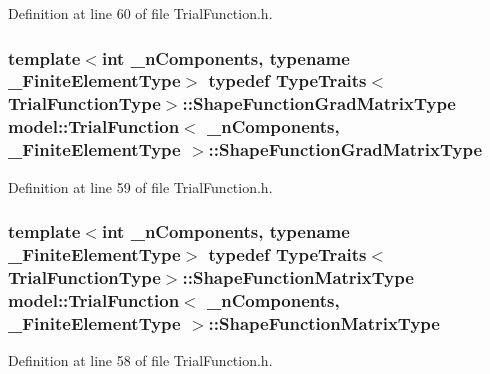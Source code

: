 Definition at line 60 of file Trial\+Function.\+h.

\hypertarget{classmodel_1_1_trial_function_adf8d15a6967d142e4b5807db94294f66}{}
\subsubsection[{Shape\+Function\+Grad\+Matrix\+Type}]{\setlength{\rightskip}{0pt plus 5cm}template$<$int \+\_\+n\+Components, typename \+\_\+\+Finite\+Element\+Type$>$ typedef {\bf Type\+Traits}$<${\bf Trial\+Function\+Type}$>$\+::{\bf Shape\+Function\+Grad\+Matrix\+Type} {\bf model\+::\+Trial\+Function}$<$ \+\_\+n\+Components, \+\_\+\+Finite\+Element\+Type $>$\+::{\bf Shape\+Function\+Grad\+Matrix\+Type}}\label{classmodel_1_1_trial_function_adf8d15a6967d142e4b5807db94294f66}


Definition at line 59 of file Trial\+Function.\+h.

\hypertarget{classmodel_1_1_trial_function_aab74b7f4994594a049e4a0201ecd0770}{}
\subsubsection[{Shape\+Function\+Matrix\+Type}]{\setlength{\rightskip}{0pt plus 5cm}template$<$int \+\_\+n\+Components, typename \+\_\+\+Finite\+Element\+Type$>$ typedef {\bf Type\+Traits}$<${\bf Trial\+Function\+Type}$>$\+::{\bf Shape\+Function\+Matrix\+Type} {\bf model\+::\+Trial\+Function}$<$ \+\_\+n\+Components, \+\_\+\+Finite\+Element\+Type $>$\+::{\bf Shape\+Function\+Matrix\+Type}}\label{classmodel_1_1_trial_function_aab74b7f4994594a049e4a0201ecd0770}


Definition at line 58 of file Trial\+Function.\+h.

\hypertarget{classmodel_1_1_trial_function_a7f044ad0cacd2e9026ea7a3861e0df9a}{}
